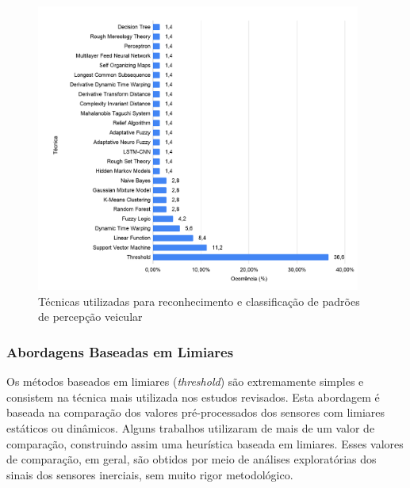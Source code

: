 \begin{figure}[h!]
  \centering
  \caption{Técnicas utilizadas para reconhecimento e classificação de padrões de percepção veicular}
   \label{fig:tecnicas_ocorrencia}
   \includegraphics[width=0.95\textwidth]{figuras/fig_19.png}
\end{figure}

\subsubsection{Abordagens Baseadas em Limiares} 

Os métodos baseados em limiares (\textit{threshold}) são extremamente simples e consistem na técnica mais utilizada nos estudos revisados. Esta abordagem é baseada na comparação dos valores pré-processados dos sensores com limiares estáticos ou dinâmicos. Alguns trabalhos utilizaram de mais de um valor de comparação, construindo assim uma heurística baseada em limiares. Esses valores de comparação, em geral, são obtidos por meio de análises exploratórias dos sinais dos sensores inerciais, sem muito rigor metodológico.

